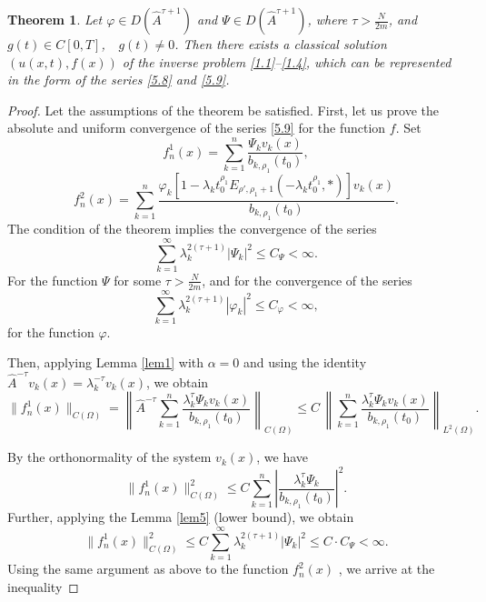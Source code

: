 \documentclass[12pt, reqno]{amsart}
\newtheorem{theorem}{Theorem}[section]
\theoremstyle{definition}
\theoremstyle{remark}
\numberwithin{equation}{section}
\begin{document}
\begin{theorem}\label{theorem2} Let $\varphi \in D(\widehat{A}^{\tau+1})$ and $\Psi \in D(\widehat{A}^{\tau+1})$, where
$
\tau > \frac{N}{2m}$, and $g(t) \in C[0,T]$, \,\, $g(t) \neq 0$.
Then there exists a classical solution $(u(x,t), f(x))$ of the inverse problem \eqref{1.1}--\eqref{1.4}, which can be represented in the form of the series \eqref{5.8} and \eqref{5.9}.
\end{theorem}
\begin{proof}
Let the assumptions of the theorem be satisfied. First, let us prove the absolute and uniform convergence of the series \eqref{5.9} for the function $f$. Set
$$
f_n^1(x)=\sum_{k=1}^{n}\frac{\Psi_k v_k(x)}{b_{k,\rho_1}(t_0)},
$$
$$
f_n^2(x)=\sum_{k=1}^{n}\frac{\varphi_k \left[ 1 - \lambda_k t_0^{\rho_1} E_{ \rho', \rho_1 + 1} \left( -\lambda_k t_0^{\rho_1}, * \right) \right]v_k(x)}{b_{k,\rho_1}(t_0)}.
$$
The condition of the theorem implies the convergence of the series
\[
\sum_{k=1}^{\infty} \lambda_k^{2(\tau+1)} |\Psi_k|^2 \le C_{\Psi} < \infty.
\]
For the function $\Psi$ for some $\tau > \frac{N}{2m}$, and for the convergence of the series
\[
\sum_{k=1}^{\infty} \lambda_k^{2(\tau+1)} |\varphi_k|^2 \le C_{\varphi}< \infty,
\]
for the function $\varphi$. 


Then, applying Lemma \ref{lem1} with $\alpha=0$ and using the identity 
$\widehat{A}^{-\tau} v_k(x)=\lambda_k^{-\tau} v_k(x)$, we obtain
 \begin{equation}\label{5.10}
\| f_n^1(x) \|_{C(\Omega)}
=
\left\|
 \widehat{A}^{-\tau} \sum_{k=1}^{n}\frac{\lambda_k^{\tau}\Psi_k v_k(x)}{b_{k,\rho_1}(t_0)}
\right\|_{C(\Omega)}
\le C \,
\left\|
\sum_{k=1}^{n}\frac{\lambda_k^{\tau}\Psi_k v_k(x)}{b_{k,\rho_1}(t_0)}
\right\|_{L^2(\Omega)}.\end{equation}

 By the orthonormality of the system ${v_k(x)}$, we have
$$
\| f_n^1(x) \|_{C(\Omega)}^2
\le
C 
\sum_{k=1}^{n}\left|\frac{\lambda_k^{\tau}\Psi_k}{b_{k,\rho_1}(t_0)}
\right|^2.
$$
Further, applying the Lemma \ref{lem5} (lower bound), we obtain
\begin{equation} \label{5.11}
\| f_n^1(x) \|_{C(\Omega)}^2
\le
C\sum_{k=1}^{\infty} \lambda_k^{2(\tau+1)} |\Psi_k|^2 \le C\cdot C_{\Psi} < \infty.
\end{equation}
Using the same argument as above to the function $f_n^2(x)$ , we arrive at the inequality


\end{proof}
\end{document}
